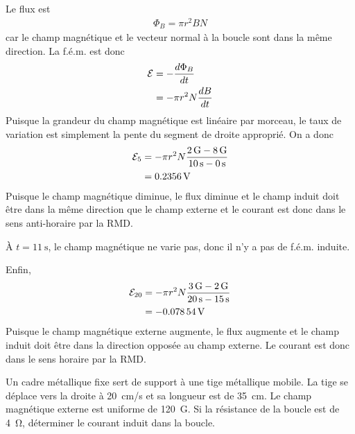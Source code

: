 \begin{reponsebox}
  Le flux est
  \begin{align*}
    \Phi_B = \pi r^2 B N
  \end{align*}
  car le champ magnétique et le vecteur normal à la boucle sont dans la même
  direction. La f.é.m. est donc
  \begin{align*}
    \mathcal{E} &= -\frac{d \Phi_B}{dt}  \\
         &= -\pi r^2 N \frac{dB}{dt}
  \end{align*}
  Puisque la grandeur du champ magnétique est linéaire par morceau, le taux de
  variation est simplement la pente du segment de droite approprié. On a donc
  \begin{align*}
    \mathcal{E}_5 &= -\pi r^2 N \frac{\SI{2}{G} - \SI{8}{G}}{\SI{10}{\second} -
              \SI{0}{\second}}  \\
           &= \SI{0.2356}{\volt}
  \end{align*}
  Puisque le champ magnétique diminue, le flux diminue et le champ induit doit
  être dans la même direction que le champ externe et le courant est donc dans
  le sens anti-horaire par la RMD.


  À $t = \SI{11}{\second}$, le champ magnétique ne varie pas, donc il n'y a pas
  de f.é.m. induite.

  Enfin,
  \begin{align*}
    \mathcal{E}_{20} &= -\pi r^2 N \frac{\SI{3}{G} - \SI{2}{G}}{\SI{20}{\second} -
              \SI{15}{\second}}  \\
           &= \SI{-0.07854}{\volt}
  \end{align*}
  Puisque le champ magnétique externe augmente, le flux augmente et le champ
  induit doit être dans la direction opposée au champ externe. Le courant est
  donc dans le sens horaire par la RMD. 

\end{reponsebox}



\begin{diapobox}

  Un cadre métallique fixe sert de support à une tige métallique mobile. La tige
  se déplace vers la droite à \SI{20}{cm/s} et sa longueur est de \SI{35}{cm}. Le
  champ magnétique externe est uniforme de \SI{120}{G}.
  Si la résistance de la boucle est de \SI{4}{\ohm}, déterminer le courant induit
  dans la boucle.

  \begin{center}
  \end{center}
\end{diapobox}

